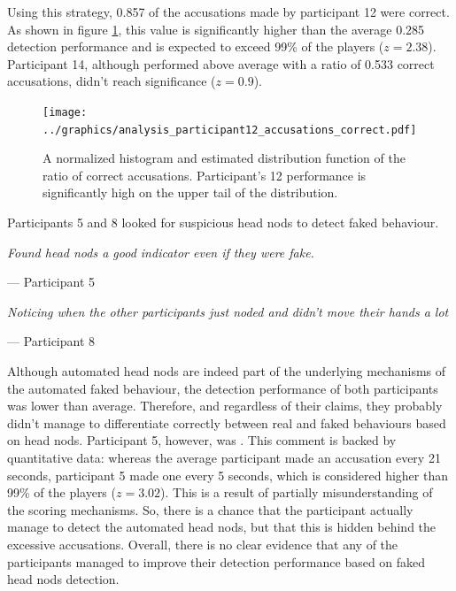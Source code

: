 \documentclass[]{simple-thesis}
\begin{document}
Using this strategy, 0.857 of the accusations made by participant 12 were correct.
As shown in figure \ref{fig:analysis:analysis_participant12_accusations_correct}, this value is significantly higher than the average 0.285 detection performance and is expected to exceed 99\% of the players ($z = 2.38$).
Participant 14, although performed above average with a ratio of 0.533 correct accusations, didn't reach significance ($z = 0.9$).

\begin{figure}
  \centering
  \texttt{[image: ../graphics/analysis\_participant12\_accusations\_correct.pdf]}
  \caption{A normalized histogram and estimated distribution function of the ratio of correct accusations. Participant's 12 performance is significantly high on the upper tail of the distribution.}
  \label{fig:analysis:analysis_participant12_accusations_correct}
\end{figure}

Participants 5 and 8 looked for suspicious head nods to detect faked behaviour.

\begin{displayquote}
  \textit{Found head nods a good indicator even if they were fake.}

  \hfill
  --- Participant 5

  \textit{Noticing when the other participants just noded and didn't move their hands a lot}

  \hfill
  --- Participant 8
\end{displayquote}

Although automated head nods are indeed part of the underlying mechanisms of the automated faked behaviour, the detection performance of both participants was lower than average.
Therefore, and regardless of their claims, they probably didn't manage to differentiate correctly between real and faked behaviours based on head nods.
Participant 5, however, was \textit{}.
This comment is backed by quantitative data: whereas the average participant made an accusation every 21 seconds, participant 5 made one every 5 seconds, which is considered higher than 99\% of the players ($z = 3.02$).
This is a result of partially misunderstanding of the scoring mechanisms.
So, there is a chance that the participant actually manage to detect the automated head nods, but that this is hidden behind the excessive accusations.
Overall, there is no clear evidence that any of the participants managed to improve their detection performance based on faked head nods detection.
\end{document}
